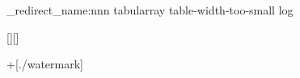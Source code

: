 
\ExplSyntaxOn
\msg_redirect_name:nnn { tabularray } { table-width-too-small } { log }
\ExplSyntaxOff

\usepackage[colorlinks]{hyperref}
\usepackage{nameref,varioref,cleveref}

\usepackage[numbered,open,openlevel=1]{bookmark}

\usepackage{glossaries}

\usepackage{zhlipsum}


[\captop][\FBwidth]

\enablecombinedlist 

\newsavebox\WaterMarkBox
{}
\background+[./watermark]{\copy\WaterMarkBox}

